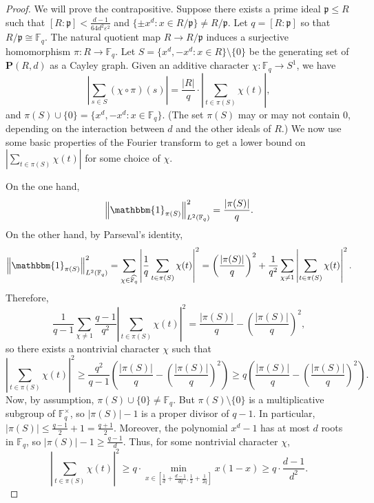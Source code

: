 \documentclass{amsart}
\theoremstyle{definition}
\numberwithin{equation}{section}
\newcommand{\F}{\mathbb{F}}
\newcommand{\p}{\mathfrak{p}}
\newcommand{\bfP}{\mathbf{P}}
\newcommand{\eps}{\varepsilon}
\renewcommand{\hat}{\widehat}
\newcommand{\ind}{\mathbbm{1}}
\newcommand{\norm}[2]{\left\| #2 \right\|_{#1}}
\begin{document}
\begin{proof}
    We will prove the contrapositive.
    Suppose there exists a prime ideal $\p \le R$ such that $[R:\p] < \frac{d-1}{64d^2\eps^2}$ and $\{\pm x^d : x \in R/\p\} \ne R/\p$.
    Let $q = [R:\p]$ so that $R/\p \cong \F_q$.
    The natural quotient map $R \to R/\p$ induces a surjective homomorphism $\pi : R \to \F_q$.
    Let $S = \{x^d, -x^d : x \in R\} \setminus \{0\}$ be the generating set of $\bfP(R,d)$ as a Cayley graph.
    Given an additive character $\chi : \F_q \to S^1$, we have
    \begin{equation*}
        \left| \sum_{s \in S} (\chi \circ \pi)(s) \right| = \frac{|R|}{q} \cdot \left| \sum_{t \in \pi(S)} \chi(t) \right|,
    \end{equation*}
    and $\pi(S) \cup \{0\} = \{x^d, -x^d : x \in \F_q\}$.
    (The set $\pi(S)$ may or may not contain $0$, depending on the interaction between $d$ and the other ideals of $R$.)
    We now use some basic properties of the Fourier transform to get a lower bound on $\left| \sum_{t \in \pi(S)} \chi(t) \right|$ for some choice of $\chi$.

    On the one hand,
    \begin{equation*}
        \norm{L^2(\F_q)}{\ind_{\pi(S)}}^2 = \frac{|\pi(S)|}{q}.
    \end{equation*}
    On the other hand, by Parseval's identity,
    \begin{equation*}
        \norm{L^2(\F_q)}{\ind_{\pi(S)}}^2 = \sum_{\chi \in \hat{\F_q}} \left| \frac{1}{q} \sum_{t \in \pi(S)} \chi(t) \right|^2 = \left( \frac{|\pi(S)|}{q} \right)^2 + \frac{1}{q^2} \sum_{\chi \ne 1} \left| \sum_{t \in \pi(S)} \chi(t) \right|^2.
    \end{equation*}
    Therefore,
    \begin{equation*}
        \frac{1}{q-1} \sum_{\chi \ne 1} \frac{q-1}{q^2} \left| \sum_{t \in \pi(S)} \chi(t) \right|^2 = \frac{|\pi(S)|}{q} - \left( \frac{|\pi(S)|}{q} \right)^2,
    \end{equation*}
    so there exists a nontrivial character $\chi$ such that
    \begin{equation*}
        \left| \sum_{t \in \pi(S)} \chi(t) \right|^2 \ge \frac{q^2}{q-1} \left( \frac{|\pi(S)|}{q} - \left( \frac{|\pi(S)|}{q} \right)^2 \right) \ge q \left( \frac{|\pi(S)|}{q} - \left( \frac{|\pi(S)|}{q} \right)^2 \right).
    \end{equation*}
    Now, by assumption, $\pi(S) \cup \{0\} \ne \F_q$.
    But $\pi(S) \setminus \{0\}$ is a multiplicative subgroup of $\F_q^{\times}$, so $|\pi(S)| - 1$ is a proper divisor of $q-1$.
    In particular, $|\pi(S)| \le \frac{q-1}{2} + 1 = \frac{q+1}{2}$.
    Moreover, the polynomial $x^d-1$ has at most $d$ roots in $\F_q$, so $|\pi(S)| - 1 \ge \frac{q-1}{d}$.
    Thus, for some nontrivial character $\chi$,
    \begin{equation*}
        \left| \sum_{t \in \pi(S)} \chi(t) \right|^2 \ge q \cdot \min_{x \in \left[ \frac{1}{d} + \frac{d-1}{dq}, \frac{1}{2} + \frac{1}{2q} \right]} x(1-x) \ge q \cdot \frac{d-1}{d^2}.
    \end{equation*}
    

\end{proof}
\end{document}
